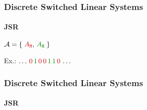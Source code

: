 \begin{frame}
    \frametitle{Discrete Switched Linear Systems}
    \framesubtitle{JSR}
    \begin{minipage}{0.59\textwidth}
        \begin{figure}[h]
            \centering
            
        \end{figure}
    \end{minipage}\hfill
    \begin{minipage}{0.39\textwidth}
        \begin{figure}[h]
            \centering
        \end{figure}
    \end{minipage}

    \begin{minipage}{0.59\textwidth}
        \centering
        \large
        $\mathcal{A} = \left\{ \;\textcolor{red!80!black}{A_{\texttt{M}}}, \,\textcolor{lqgcolour}{A_{\texttt{H}}}\; \right\}$
    \end{minipage}\hfill
    \begin{minipage}{0.39\textwidth}
        \centering
        \large
        Ex.: $\dots \,\textcolor{red!80!black}{0} \, \textcolor{lqgcolour}{1} \, \textcolor{red!80!black}{0} \, \textcolor{red!80!black}{0} \, \textcolor{lqgcolour}{1} \, \textcolor{lqgcolour}{1}\, \textcolor{red!80!black}{0} \,\dots$
    \end{minipage}
\end{frame}


\begin{frame}
    \frametitle{Discrete Switched Linear Systems}
    \framesubtitle{JSR}
    \begin{figure}[h]
        \centering
        
    \end{figure}
\end{frame}
